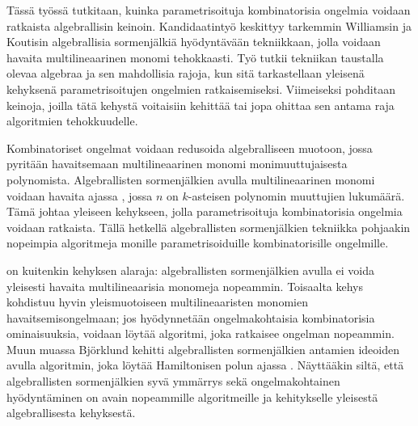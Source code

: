 %
%

\begin{fiabstract}
  Tässä työssä tutkitaan, kuinka parametrisoituja kombinatorisia ongelmia voidaan 
  ratkaista %
  algebrallisin keinoin. Kandidaatintyö keskittyy tarkemmin 
  Williamsin ja Koutisin algebrallisia sormenjälkiä hyödyntävään 
  tekniikkaan, jolla voidaan havaita multilineaarinen monomi tehokkaasti. 
  Työ tutkii tekniikan taustalla olevaa algebraa ja sen mahdollisia rajoja,  
  kun sitä tarkastellaan yleisenä kehyksenä parametrisoitujen ongelmien ratkaisemiseksi. 
  Viimeiseksi pohditaan keinoja, joilla tätä kehystä voitaisiin kehittää tai jopa 
  ohittaa sen antama raja algoritmien tehokkuudelle. 

  Kombinatoriset ongelmat voidaan redusoida algebralliseen muotoon, jossa 
  pyritään havaitsemaan multilineaarinen monomi monimuuttujaisesta polynomista. 
  Algebrallisten sormenjälkien avulla multilineaarinen monomi 
  voidaan havaita ajassa , 
  jossa $n$ on $k$-asteisen polynomin muuttujien lukumäärä. Tämä johtaa yleiseen kehykseen, 
  jolla parametrisoituja kombinatorisia ongelmia voidaan ratkaista. 
  Tällä hetkellä algebrallisten sormenjälkien 
  tekniikka pohjaakin nopeimpia algoritmeja monille parametrisoiduille 
  kombinatorisille ongelmille.

   on kuitenkin 
  kehyksen alaraja: algebrallisten sormenjälkien 
  avulla ei voida yleisesti havaita multilineaarisia monomeja nopeammin. Toisaalta 
  kehys kohdistuu hyvin yleismuotoiseen multilineaaristen monomien havaitsemisongelmaan; 
  jos hyödynnetään ongelmakohtaisia kombinatorisia ominaisuuksia, 
  voidaan löytää algoritmi, joka ratkaisee ongelman nopeammin. 
  Muun muassa Björklund kehitti 
  algebrallisten sormenjälkien antamien ideoiden avulla algoritmin, joka 
  löytää Hamiltonisen polun ajassa . 
  Näyttääkin siltä, että algebrallisten sormenjälkien syvä ymmärrys sekä ongelmakohtainen 
  hyödyntäminen on avain nopeammille algoritmeille ja kehitykselle yleisestä algebrallisesta 
  kehyksestä.
%

\end{fiabstract}
